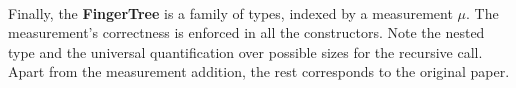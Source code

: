 \documentclass[12pt,twoside,notitlepage]{report}
\begin{document}
\begin{code}
\\
\>  \AgdaSymbol{\{}\AgdaSymbol{\}} \AgdaSymbol{(} \AgdaSymbol{:}  \AgdaSymbol{):}   \<%
\\
\>[0]\<[2]%
\>[2] \<[8]%
\>[8]\AgdaSymbol{:}    \<%
\\
\>[0]\<[2]%
\>[2] \<[8]%
\>[8]\AgdaSymbol{:}      \<%
\\
\>[0]\<[2]%
\>[2] \AgdaSymbol{:}        \<%
\\
\>[0]\<[2]%
\>[2] \<[8]%
\>[8]\AgdaSymbol{:}          \<%
\\
\end{code}
Finally, the \textbf{FingerTree} is a family of types, indexed by a measurement $\mu$. The measurement's correctness is enforced in all the constructors. Note the nested type and the universal quantification over possible sizes for the recursive call. Apart from the measurement addition, the rest corresponds to the original paper.
\end{document}
